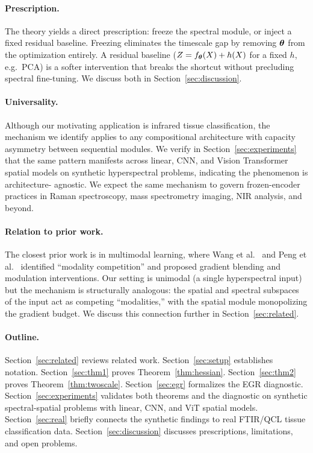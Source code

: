 \paragraph{Prescription.}
The theory yields a direct prescription: freeze the spectral module,
or inject a fixed residual baseline. Freezing eliminates the timescale
gap by removing ${\boldsymbol{\theta}}$ from the optimization entirely. A residual
baseline ($Z = f_{\boldsymbol{\theta}}(X) + h(X)$ for a fixed $h$, e.g.\ PCA) is a
softer intervention that breaks the shortcut without precluding spectral
fine-tuning. We discuss both in Section~\ref{sec:discussion}.

\paragraph{Universality.}
Although our motivating application is infrared tissue classification,
the mechanism we identify applies to any compositional architecture
with capacity asymmetry between sequential modules. We verify in
Section~\ref{sec:experiments} that the same pattern manifests across
linear, CNN, and Vision Transformer spatial models on synthetic
hyperspectral problems, indicating the phenomenon is architecture-
agnostic. We expect the same mechanism to govern frozen-encoder
practices in Raman spectroscopy, mass spectrometry imaging, NIR
analysis, and beyond.

\paragraph{Relation to prior work.}
The closest prior work is in multimodal learning, where Wang et
al.~\cite{wang2020what} and Peng et al.~\cite{peng2022balanced}
identified ``modality competition'' and proposed gradient blending and
modulation interventions. Our setting is unimodal (a single
hyperspectral input) but the mechanism is structurally analogous: the
spatial and spectral subspaces of the input act as competing
``modalities,'' with the spatial module monopolizing the gradient
budget. We discuss this connection further in
Section~\ref{sec:related}.

\paragraph{Outline.}
Section~\ref{sec:related} reviews related work. Section~\ref{sec:setup}
establishes notation. Section~\ref{sec:thm1} proves
Theorem~\ref{thm:hessian}. Section~\ref{sec:thm2} proves
Theorem~\ref{thm:twoscale}. Section~\ref{sec:egr} formalizes the EGR
diagnostic. Section~\ref{sec:experiments} validates both theorems and
the diagnostic on synthetic spectral-spatial problems with linear, CNN,
and ViT spatial models. Section~\ref{sec:real} briefly connects the
synthetic findings to real FTIR/QCL tissue classification data.
Section~\ref{sec:discussion} discusses prescriptions, limitations, and
open problems.
